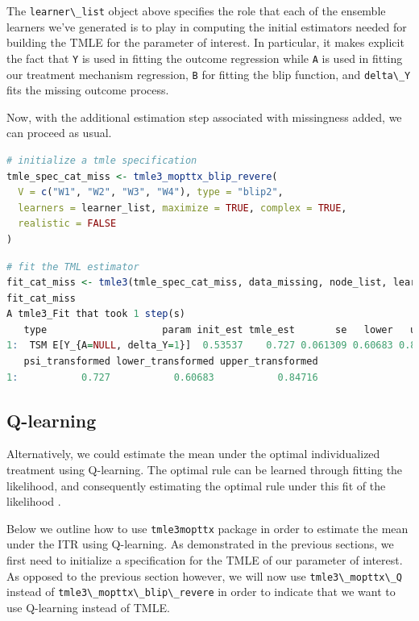 \documentclass[
  12pt, krantz2,
]{krantz}
\newcommand{\passthrough}[1]{#1}
\newcommand{\1}{\mathbbm{1}}
\theoremstyle{definition}
\theoremstyle{definition}
\theoremstyle{definition}
\theoremstyle{definition}
\theoremstyle{remark}
\begin{document}
The \passthrough{\lstinline!learner\_list!} object above specifies the role that each of the ensemble
learners we've generated is to play in computing the initial estimators needed
for building the TMLE for the parameter of interest. In particular, it makes
explicit the fact that \passthrough{\lstinline!Y!} is used in fitting the outcome regression
while \passthrough{\lstinline!A!} is used in fitting our treatment mechanism regression,
\passthrough{\lstinline!B!} for fitting the blip function, and \passthrough{\lstinline!delta\_Y!} fits the missing outcome process.

Now, with the additional estimation step associated with missingness added, we can
proceed as usual.

\begin{lstlisting}[language=R]
# initialize a tmle specification
tmle_spec_cat_miss <- tmle3_mopttx_blip_revere(
  V = c("W1", "W2", "W3", "W4"), type = "blip2",
  learners = learner_list, maximize = TRUE, complex = TRUE,
  realistic = FALSE
)
\end{lstlisting}

\begin{lstlisting}[language=R]
# fit the TML estimator
fit_cat_miss <- tmle3(tmle_spec_cat_miss, data_missing, node_list, learner_list)
fit_cat_miss
A tmle3_Fit that took 1 step(s)
   type                    param init_est tmle_est       se   lower   upper
1:  TSM E[Y_{A=NULL, delta_Y=1}]  0.53537    0.727 0.061309 0.60683 0.84716
   psi_transformed lower_transformed upper_transformed
1:           0.727           0.60683           0.84716
\end{lstlisting}

\hypertarget{q-learning}{%
\subsection{Q-learning}\label{q-learning}}

Alternatively, we could estimate the mean under the optimal individualized
treatment using Q-learning. The optimal rule can be learned through fitting the
likelihood, and consequently estimating the optimal rule under this fit of the
likelihood \citep{Sutton1998, murphy2003}.

Below we outline how to use \passthrough{\lstinline!tmle3mopttx!} package in order to estimate the mean
under the ITR using Q-learning. As demonstrated in the previous sections, we
first need to initialize a specification for the TMLE of our parameter of
interest. As opposed to the previous section however, we will now use
\passthrough{\lstinline!tmle3\_mopttx\_Q!} instead of \passthrough{\lstinline!tmle3\_mopttx\_blip\_revere!} in order to indicate that
we want to use Q-learning instead of TMLE.
\end{document}
